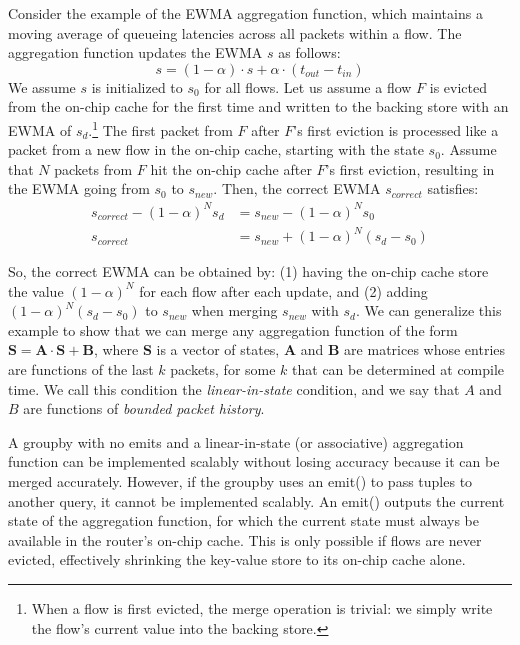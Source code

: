Consider the example of the EWMA aggregation function, which maintains a moving
average of queueing latencies across all packets within a flow. The aggregation
function updates the EWMA $s$ as follows:
\[ s = (1 - \alpha) \cdot s + \alpha \cdot (t_{out} - t_{in}) \]
We assume $s$ is initialized to $s_0$ for all flows. Let us assume a flow $F$ is
evicted from the on-chip cache for the first time and written to the backing
store with an EWMA of $s_d$.\footnote{When a flow is first evicted, the merge
operation is trivial: we simply write the flow's current value into the backing
store.} The first packet from $F$ after $F$'s first eviction  is processed like a
packet from a new flow in the on-chip cache, starting with the state $s_0$.
Assume that $N$ packets from $F$ hit the on-chip cache after $F$'s first eviction,
resulting in the EWMA going from $s_0$ to $s_{new}$.  Then, the correct EWMA
$s_{correct}$ satisfies:
\begin{align*}
s_{correct} - (1-\alpha)^N s_d &= s_{new} - (1-\alpha)^N s_0 \\
s_{correct} &= s_{new} + (1-\alpha)^N(s_d - s_0)
\end{align*}

So, the correct EWMA can be obtained by: (1) having the on-chip cache store the
value $(1-\alpha)^N$ for each flow after each update, and (2) adding
$(1-\alpha)^N(s_d - s_0)$ to $s_{new}$ when merging $s_{new}$ with $s_d$. We
can generalize this example to show that we can merge any aggregation function
of the form $\boldsymbol{S} = \boldsymbol{A} \cdot \boldsymbol{S} +
\boldsymbol{B}$, where $\boldsymbol{S}$ is a vector of states, $\boldsymbol{A}$
and $\boldsymbol{B}$ are matrices whose entries are functions of the last $k$
packets, for some $k$ that can be determined at compile time. We call this
condition the {\em linear-in-state} condition, and we say that $A$ and $B$ are
functions of {\em bounded packet history}.

A {\ct groupby} with no {\ct emit}s and a linear-in-state (or associative)
aggregation function can be implemented scalably without losing accuracy because
it can be merged accurately.
However, if the {\ct groupby} uses an {\ct emit()} to pass tuples to another
query, it cannot be implemented scalably. An {\ct emit()} outputs the current state
of the aggregation function, for which the current state must always be
available in the router's on-chip cache. This is only possible if flows are
never evicted, effectively shrinking the key-value store to its on-chip cache
alone.


